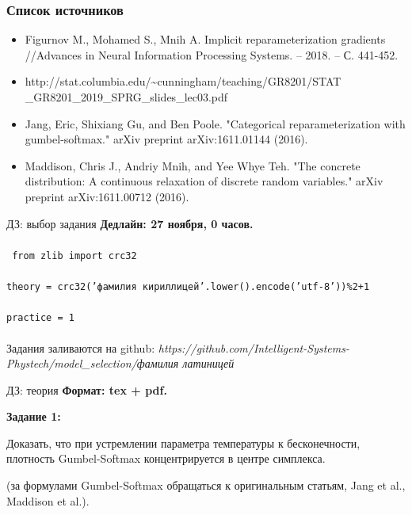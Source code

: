 \documentclass[10pt,pdf,utf8,russian,aspectratio=169]{beamer}
\begin{document}
\begin{frame}
\frametitle{Список источников}
\begin{itemize}

\item Figurnov M., Mohamed S., Mnih A. Implicit reparameterization gradients //Advances in Neural Information Processing Systems. – 2018. – С. 441-452.
\item http://stat.columbia.edu/{\textasciitilde}cunningham/teaching/GR8201/STAT\\\_GR8201\_2019\_SPRG\_slides\_lec03.pdf
\item Jang, Eric, Shixiang Gu, and Ben Poole. "Categorical reparameterization with gumbel-softmax." arXiv preprint arXiv:1611.01144 (2016).
\item Maddison, Chris J., Andriy Mnih, and Yee Whye Teh. "The concrete distribution: A continuous relaxation of discrete random variables." arXiv preprint arXiv:1611.00712 (2016).
\end{itemize}
\end{frame}



\begin{frame}{ДЗ: выбор задания}
\textbf{Дедлайн: 27 ноября, 0 часов.}\\~\\

\texttt{ from zlib import crc32}\\~\\
\texttt{theory = crc32('фамилия кириллицей'.lower().encode('utf-8'))\%2+1}\\~\\
\texttt{practice = 1}\\~\\

Задания заливаются на github:
\textit{https://github.com/Intelligent-Systems-Phystech/model\_selection/фамилия латиницей}\\

\end{frame}

\begin{frame}{ДЗ: теория}
\textbf{Формат: tex + pdf.}

\textbf{Задание 1:}

Доказать, что при устремлении параметра температуры к бесконечности, плотность Gumbel-Softmax концентрируется в центре симплекса.

(за формулами Gumbel-Softmax обращаться к оригинальным статьям, Jang et al., Maddison et al.).
\end{frame}
\end{document}
